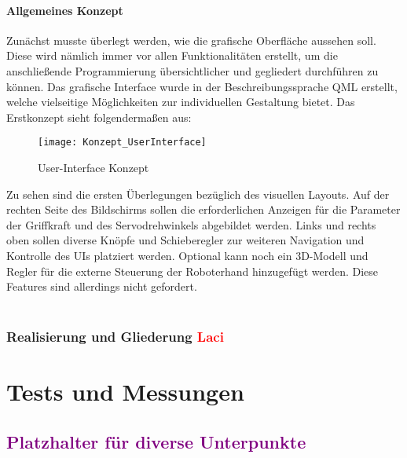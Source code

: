 \documentclass[titlepage,12pt,twoside]{article}
\begin{document}
\paragraph{Allgemeines Konzept}
\hfill \break
\hfill \break
Zunächst musste überlegt werden, wie die grafische Oberfläche aussehen soll. Diese wird nämlich immer vor allen Funktionalitäten 
erstellt, um die anschließende Programmierung übersichtlicher und gegliedert durchführen zu können. Das grafische Interface wurde 
in der Beschreibungssprache QML erstellt, welche vielseitige Möglichkeiten zur individuellen Gestaltung bietet. Das Erstkonzept
sieht folgendermaßen aus:
	\begin{figure}[H]
		\begin{center}
			\scalebox{1.2}
			{\texttt{[image: Konzept\_UserInterface]}}
			\caption{User-Interface Konzept}
			\label{fig:Konzept_UserInterface}				
		\end{center}
	\end{figure}
Zu sehen sind die ersten Überlegungen bezüglich des visuellen Layouts. Auf der rechten Seite des Bildschirms sollen die erforderlichen
Anzeigen für die Parameter der Griffkraft und des Servodrehwinkels abgebildet werden. Links und rechts oben sollen diverse Knöpfe 
und Schieberegler zur weiteren Navigation und Kontrolle des UIs platziert werden. Optional kann noch ein 3D-Modell und Regler für 
die externe Steuerung der Roboterhand hinzugefügt werden. Diese Features sind allerdings nicht gefordert. \\
\\


\subsubsection{Realisierung und Gliederung \textcolor{red}{Laci}}

\section{Tests und Messungen}
\subsection{\textcolor{purple}{Platzhalter für diverse Unterpunkte}}
\end{document}
